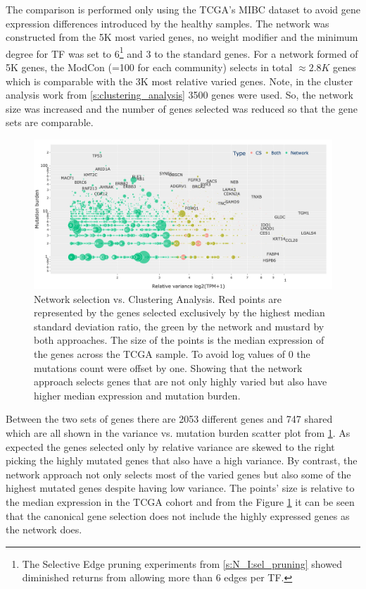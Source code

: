 The comparison is performed only using the TCGA's MIBC dataset to avoid gene expression differences introduced by the healthy samples. The network was constructed from the 5K most varied genes, no weight modifier and the minimum degree for TF  was set to 6\footnote{The Selective Edge pruning experiments from \cref{s:N_I:sel_pruning} showed diminished returns from allowing more than 6 edges per TF.} and 3 to the standard genes. For a network formed of 5K genes, the ModCon (=100 for each community) selects in total $\approx2.8K$ genes which is comparable with the 3K most relative varied genes. Note, in the cluster analysis work from \cref{s:clustering_analysis} 3500 genes were used. So, the network size was increased and the number of genes selected was reduced so that the gene sets are comparable.

\begin{figure}[!t]    
    \centering\includegraphics[width=1.0\textwidth,keepaspectratio]{Sections/Network_I/Resources/Tum_network/ClusteringAnalysis_vs_Network_3.png}
    \caption[Gene selection: network vs clustering analysis]{Network selection vs. Clustering Analysis. Red points are represented by the genes selected exclusively by the highest median standard deviation ratio, the green by the network and mustard by both approaches. The size of the points is the median expression of the genes across the TCGA sample. To avoid log values of 0 the mutations count were offset by one. Showing that the network approach selects genes that are not only highly varied but also have higher median expression and mutation burden.}
    \label{fig:N_I:network_ca_selection}
\end{figure}

Between the two sets of genes there are 2053 different genes and 747 shared which are all shown in the variance vs. mutation burden scatter plot from \cref{fig:N_I:network_ca_selection}. As expected the genes selected only by relative variance are skewed to the right picking the highly mutated genes that also have a high variance. By contrast, the network approach not only selects most of the varied genes but also some of the highest mutated genes despite having low variance. The points' size is relative to the median expression in the TCGA cohort and from the Figure \ref{fig:N_I:network_ca_selection} it can be seen that the canonical gene selection does not include the highly expressed genes as the network does.


